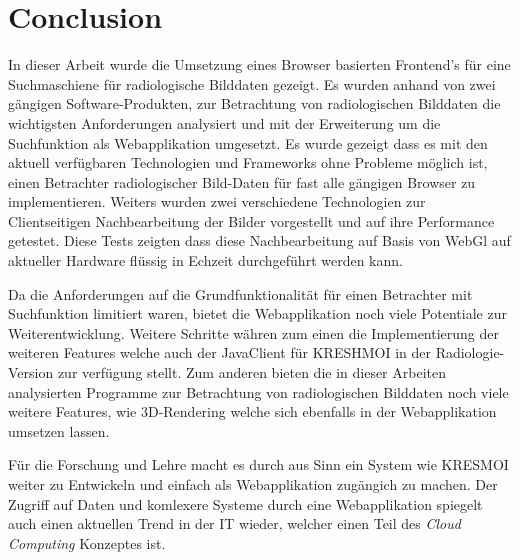
\section{Conclusion}
\label{sec:conclusion}
In dieser Arbeit wurde die Umsetzung eines Browser basierten Frontend's für eine Suchmaschiene für radiologische Bilddaten gezeigt.
Es wurden anhand von zwei gängigen Software-Produkten,
zur Betrachtung von radiologischen Bilddaten die wichtigsten Anforderungen analysiert und mit der Erweiterung um die Suchfunktion als Webapplikation umgesetzt.
Es wurde gezeigt dass es mit den aktuell verfügbaren Technologien und Frameworks ohne Probleme möglich ist,
einen Betrachter radiologischer Bild-Daten für fast alle gängigen Browser zu implementieren.
Weiters wurden zwei verschiedene Technologien zur Clientseitigen Nachbearbeitung der Bilder vorgestellt und auf ihre Performance getestet.
Diese Tests zeigten dass diese Nachbearbeitung auf Basis von WebGl auf aktueller Hardware flüssig in Echzeit durchgeführt werden kann.

Da die Anforderungen auf die Grundfunktionalität für einen Betrachter mit Suchfunktion limitiert waren,
bietet die Webapplikation noch viele Potentiale zur Weiterentwicklung.
Weitere Schritte währen zum einen die Implementierung der weiteren Features welche auch der JavaClient für KRESHMOI in der Radiologie-Version zur verfügung stellt.
Zum anderen bieten die in dieser Arbeiten analysierten Programme zur Betrachtung von radiologischen Bilddaten noch viele weitere Features,
wie 3D-Rendering welche sich ebenfalls in der Webapplikation umsetzen lassen.

Für die Forschung und Lehre macht es durch aus Sinn ein System wie KRESMOI weiter zu Entwickeln und einfach als Webapplikation zugängich zu machen.
Der Zugriff auf Daten und komlexere Systeme durch eine Webapplikation spiegelt auch einen aktuellen Trend in der IT wieder, 
welcher einen Teil des \textit{Cloud Computing} Konzeptes ist.

